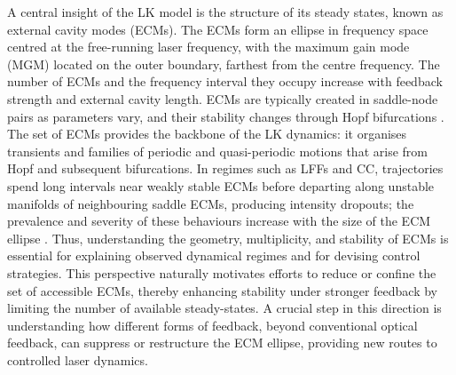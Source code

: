 %
A central insight of the LK model is the structure of its steady states, known as external cavity modes (ECMs).
The ECMs form an ellipse in frequency space centred at the free-running laser frequency, with the maximum gain mode (MGM) located on the outer boundary, farthest from the centre frequency.
The number of ECMs and the frequency interval they occupy increase with feedback strength and external cavity length. 
ECMs are typically created in saddle-node pairs as parameters vary, and their stability changes through Hopf bifurcations \cite{heil2003delay, rottschafer2007ecm}.
The set of ECMs provides the backbone of the LK dynamics: it organises transients and families of periodic and quasi-periodic motions that arise from Hopf and subsequent bifurcations.
In regimes such as LFFs and CC, trajectories spend long intervals near weakly stable ECMs before departing along unstable manifolds of neighbouring saddle ECMs, producing intensity dropouts; the prevalence and severity of these behaviours increase with the size of the ECM ellipse \cite{heil2003delay, krauskopf2004dynamics}.
Thus, understanding the geometry, multiplicity, and stability of ECMs is essential for explaining observed dynamical regimes and for devising control strategies.
This perspective naturally motivates efforts to reduce or confine the set of accessible ECMs, thereby enhancing stability under stronger feedback by limiting the number of available steady-states.
A crucial step in this direction is understanding how different forms of feedback, beyond conventional optical feedback, can suppress or restructure the ECM ellipse, providing new routes to controlled laser dynamics.
%
%
